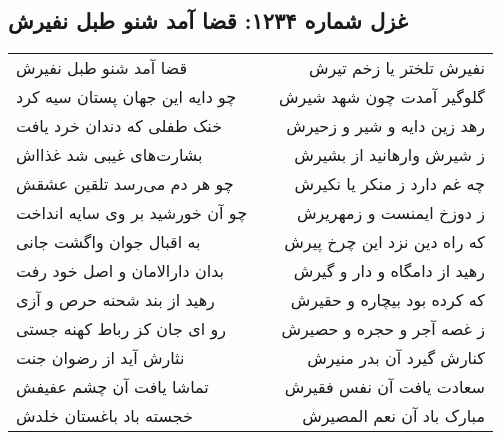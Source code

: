 \begin{center}
\section*{غزل شماره ۱۲۳۴: قضا آمد شنو طبل نفیرش}
\label{sec:1234}
\begin{longtable}{l p{0.5cm} r}
قضا آمد شنو طبل نفیرش
&&
نفیرش تلختر یا زخم تیرش
\\
چو دایه این جهان پستان سیه کرد
&&
گلوگیر آمدت چون شهد شیرش
\\
خنک طفلی که دندان خرد یافت
&&
رهد زین دایه و شیر و زحیرش
\\
بشارت‌های غیبی شد غذااش
&&
ز شیرش وارهانید از بشیرش
\\
چو هر دم می‌رسد تلقین عشقش
&&
چه غم دارد ز منکر یا نکیرش
\\
چو آن خورشید بر وی سایه انداخت
&&
ز دوزخ ایمنست و زمهریرش
\\
به اقبال جوان واگشت جانی
&&
که راه دین نزد این چرخ پیرش
\\
بدان دارالامان و اصل خود رفت
&&
رهید از دامگاه و دار و گیرش
\\
رهید از بند شحنه حرص و آزی
&&
که کرده بود بیچاره و حقیرش
\\
رو ای جان کز رباط کهنه جستی
&&
ز غصه آجر و حجره و حصیرش
\\
نثارش آید از رضوان جنت
&&
کنارش گیرد آن بدر منیرش
\\
تماشا یافت آن چشم عفیفش
&&
سعادت یافت آن نفس فقیرش
\\
خجسته باد باغستان خلدش
&&
مبارک باد آن نعم المصیرش
\\
\end{longtable}
\end{center}
